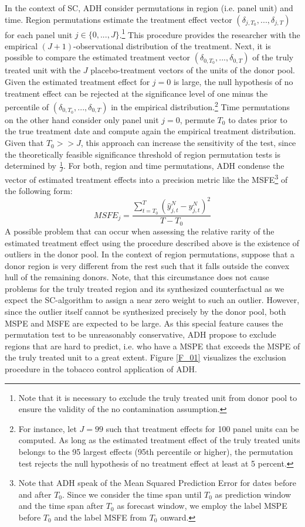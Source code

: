 In the context of \ac{SC}, \ac{ADH} consider permutations in region (i.e. panel unit) and time. Region permutations estimate the treatment effect vector $(\delta_{j,T_0}, ..., \delta_{j,T})$ for each panel unit $j \in \{0, ..., J \}$.\footnote{Note that it is necessary to exclude the truly treated unit from donor pool to ensure the validity of the no contamination assumption.} This procedure provides the researcher with the empirical $(J+1)$-observational distribution of the treatment. Next, it is possible to compare the estimated treatment vector $(\delta_{0,T_0}, ..., \delta_{0,T})$ of the truly treated unit with the $J$ placebo-treatment vectors of the units of the donor pool. Given the estimated treatment effect for $j=0$ is large, the null hypothesis of no treatment effect can be rejected at the significance level of one minus the percentile of $(\delta_{0,T_0}, ..., \delta_{0,T})$ in the empirical distribution.\footnote{For instance, let $J = 99$ such that treatment effects for 100 panel units can be computed. As long as the estimated treatment effect of the truly treated units belongs to the 95 largest effects (95th percentile or higher), the permutation test rejects the null hypothesis of no treatment effect at least at 5 percent.} Time permutations on the other hand consider only panel unit $j = 0$, permute $T_0$ to dates prior to the true treatment date and compute again the empirical treatment distribution. Given that $T_0 >> J$, this approach can increase the sensitivity of the test, since the theoretically feasible significance threshold of region permutation tests is determined by $\frac{1}{J}$. For both, region and time permutations, \ac{ADH} condense the vector of estimated treatment effects into a precision metric like the \ac{MSFE}\footnote{Note that \ac{ADH} speak of the Mean Squared Prediction Error for dates before and after $T_0$. Since we consider the time span until $T_0$ as prediction window and the time span after $T_0$ as forecast window, we employ the label \ac{MSPE} before $T_0$ and the label \ac{MSFE} from $T_0$ onward.} of the following form:
\[
MSFE_j = \frac{\sum_{t = T_0}^{T} \left(\widehat{y}_{j,t}^N - y_{j,t}^N\right) ^2}{T- T_0}
\]
A possible problem that can occur when assessing the relative rarity of the estimated treatment effect using the procedure described above is the existence of outliers in the donor pool. In the context of region permutations, suppose that a donor region is very different from the rest such that it falls outside the convex hull of the remaining donors. Note, that this circumstance does not cause problems for the truly treated region and its synthesized counterfactual as we expect the \ac{SC}-algorithm to assign a near zero weight to such an outlier. However, since the outlier itself cannot be synthesized precisely by the donor pool, both \ac{MSPE} and \ac{MSFE} are expected to be large. As this special feature causes the permutation test to be unreasonably conservative, \ac{ADH} propose to exclude regions that are hard to predict, i.e. who have a \ac{MSPE} that exceeds the \ac{MSPE} of the truly treated unit to a great extent. Figure \ref{F_01} visualizes the exclusion procedure in the tobacco control application of \ac{ADH}. 

